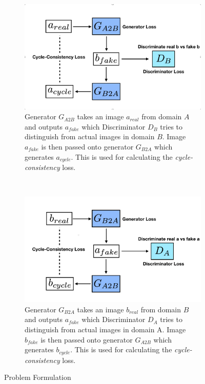 \documentclass[10pt,twocolumn,letterpaper]{article}
\begin{document}
\begin{figure}[!htb]
     \centering
     \begin{subfigure}[b]{0.4\textwidth}
         \centering
         \includegraphics[width=\textwidth]{gan_b}
         \caption{Generator $G_{A2B}$ takes an image $a_{real}$ from domain $A$ and outputs $a_{fake}$ which Discriminator $D_B$ tries to distinguish from actual images in domain $B$. Image $a_{fake}$ is then passed onto generator $G_{B2A}$ which generates $a_{cycle}$. This is used for calculating the \textit{cycle-consistency} loss.}
         \label{fig:gan_b}
     \end{subfigure}
     ~
     \begin{subfigure}[b]{0.4\textwidth}
         \centering
         \includegraphics[width=\textwidth]{gan_a}
         \caption{Generator $G_{B2A}$ takes an image $b_{real}$ from domain $B$ and outputs $a_{fake}$ which Discriminator $D_A$ tries to distinguish from actual images in domain A. Image $b_{fake}$ is then passed onto generator $G_{A2B}$ which generates $b_{cycle}$. This is used for calculating the \textit{cycle-consistency} loss.}
         \label{fig:gan_a}
     \end{subfigure}
        \caption{Problem Formulation}
        \label{fig:problem}
\end{figure} 
\end{document}
